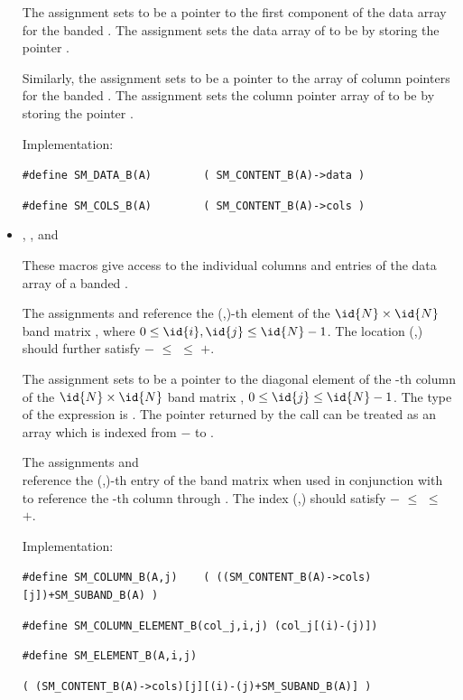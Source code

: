 \begin{itemize}
  The assignment  sets  to be
  a pointer to the first component of the data array for the
  banded  .  The assignment  sets the data array of  to be  by storing
  the pointer .

  Similarly, the assignment  sets  to be
  a pointer to the array of column pointers for the banded  .
  The assignment  sets the column pointer
  array of  to be  by storing the pointer .

  Implementation:

  \verb|#define SM_DATA_B(A)        ( SM_CONTENT_B(A)->data )|

  \verb|#define SM_COLS_B(A)        ( SM_CONTENT_B(A)->cols )|


\item {}, , and 

  These macros give access to the individual columns and entries of
  the data array of a banded .

  The assignments  and  reference the (,)-th element of the
  $\id{N} \times \id{N}$ band matrix , where $0 \le \id{i}, \id{j} \le \id{N}-1$.
  The location (,) should further satisfy
  $-$ $\le$  $\le$ $+$.

  The assignment  sets  to be
  a pointer to the diagonal element of the -th column of the
  $\id{N} \times \id{N}$ band matrix , $0 \le \id{j} \le \id{N}-1$.
  The type of the expression  is .
  The pointer returned by the call  can be treated as
  an array which is indexed from $-$ to .

  The assignments  and\\
   reference the
  (,)-th entry of the band matrix  when used in
  conjunction with  to reference the -th column
  through . The index (,) should satisfy
  $-$ $\le$  $\le$ $+$.

  Implementation:

  \verb|#define SM_COLUMN_B(A,j)    ( ((SM_CONTENT_B(A)->cols)[j])+SM_SUBAND_B(A) )|

  \verb|#define SM_COLUMN_ELEMENT_B(col_j,i,j) (col_j[(i)-(j)])|

  \verb|#define SM_ELEMENT_B(A,i,j)|

  \hspace{1in} \verb|( (SM_CONTENT_B(A)->cols)[j][(i)-(j)+SM_SUBAND_B(A)] )|

\end{itemize}


